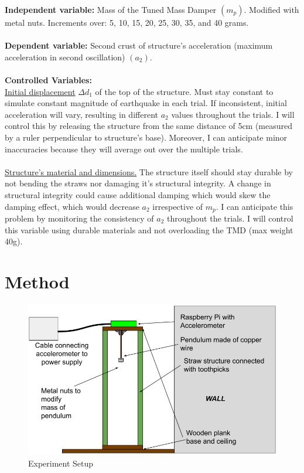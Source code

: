 \documentclass[11pt]{article}
\begin{document}
\textbf{Independent variable: }
Mass of the Tuned Mass Damper $(m_p)$. Modified with metal nuts. Increments over: 5, 10, 15, 20, 25, 30, 35, and 40 grams.
\\ \\
\textbf{Dependent variable:} 
Second crust of structure's acceleration (maximum acceleration in second oscillation) $(a_2)$.
\\ \\
\textbf{Controlled Variables:}
\\ \underline{Initial displacement} $\Delta d_1$ of the top of the structure. Must stay constant to simulate constant magnitude of earthquake in each trial. If inconsistent, initial acceleration will vary, resulting in different $a_2$ values throughout the trials. I will control this by releasing the structure from the same distance of 5cm (measured by a ruler perpendicular to structure's base). Moreover, I can anticipate minor inaccuracies because they will average out over the multiple trials.
\\ \\ \underline{Structure’s material and dimensions.} The structure itself should stay durable by not bending the straws nor damaging it's structural integrity. A change in structural integrity could cause additional damping which would skew the damping effect, which would decrease $a_2$ irrespective of $m_p$. I can anticipate this problem by monitoring the consistency of $a_2$ throughout the trials. I will control this variable using durable materials and not overloading the TMD (max weight 40g). 


\section{Method} 


\begin{figure}[h]
\centering
\includegraphics[width=330pt]{img/fig4.jpg}
\caption{\label{fig:4}Experiment Setup}
\end{figure}
\end{document}
